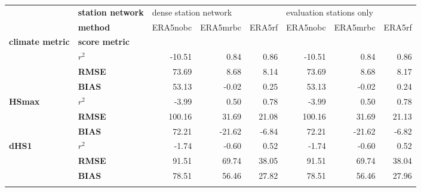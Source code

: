 \begin{table}[t]
\centering
\begin{tabular}{llrrrrrr}
\tophline
     & \textbf{station network} & \multicolumn{3}{l}{dense station network} & \multicolumn{3}{l}{evaluation stations only} \\
     & \textbf{method} &              ERA5nobc & ERA5mrbc & ERA5rf &                 ERA5nobc & ERA5mrbc & ERA5rf \\
\textbf{climate metric} & \textbf{score metric} &                       &          &        &                          &          &        \\
\middlehline
\multirow{3}{*}{\textbf{HSavg}} & \textbf{$r^{2}$} &                -10.51 &     0.84 &   0.86 &                   -10.51 &     0.84 &   0.86 \\
     & \textbf{RMSE} &                 73.69 &     8.68 &   8.14 &                    73.69 &     8.68 &   8.17 \\
     & \textbf{BIAS} &                 53.13 &    -0.02 &   0.25 &                    53.13 &    -0.02 &   0.24 \\
\cline{1-8}
\multirow{3}{*}{\textbf{HSmax}} & \textbf{$r^{2}$} &                 -3.99 &     0.50 &   0.78 &                    -3.99 &     0.50 &   0.78 \\
     & \textbf{RMSE} &                100.16 &    31.69 &  21.08 &                   100.16 &    31.69 &  21.13 \\
     & \textbf{BIAS} &                 72.21 &   -21.62 &  -6.84 &                    72.21 &   -21.62 &  -6.82 \\
\cline{1-8}
\multirow{3}{*}{\textbf{dHS1}} & \textbf{$r^{2}$} &                 -1.74 &    -0.60 &   0.52 &                    -1.74 &    -0.60 &   0.52 \\
     & \textbf{RMSE} &                 91.51 &    69.74 &  38.05 &                    91.51 &    69.74 &  38.04 \\
     & \textbf{BIAS} &                 78.51 &    56.46 &  27.82 &                    78.51 &    56.46 &  27.96 \\
\bottomhline
\end{tabular}
\end{table}
